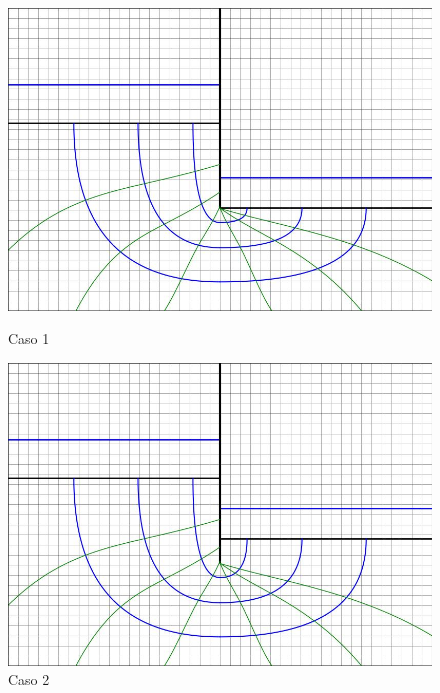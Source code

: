 \begin{figure}[H]
    \centering
    \begin{minipage}{0.32\textwidth}
        \centering
        \includegraphics[width=\textwidth]{GRAFICOS/caso_1.jpg}
        \caption{Caso 1}
    \end{minipage}
    \begin{minipage}{0.32\textwidth}
        \centering
        \includegraphics[width=\textwidth]{GRAFICOS/caso_2.jpg}
        \caption{Caso 2}
    \end{minipage}
    \begin{minipage}{0.32\textwidth}
        \centering

\end{minipage}
\end{figure}
